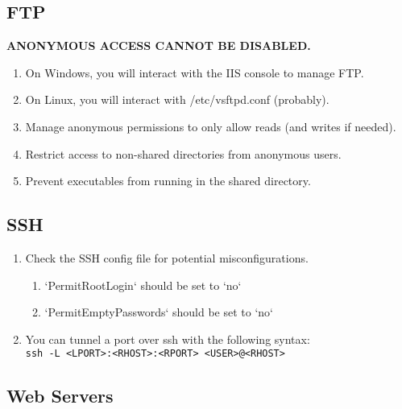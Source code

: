 \documentclass[12pt,letterpaper]{article}
\def\code#1{\textcolor{iris}{\texttt{#1}}}
\def\bf#1{\textbf{#1}}
\begin{document}
\subsection{FTP}

\bf{ANONYMOUS ACCESS CANNOT BE DISABLED.}

\begin{enumerate}
	\item On Windows, you will interact with the IIS console to manage FTP.
	\item On Linux, you will interact with /etc/vsftpd.conf (probably).
	\item Manage anonymous permissions to only allow reads (and writes if needed).
	\item Restrict access to non-shared directories from anonymous users.
	\item Prevent executables from running in the shared directory.
\end{enumerate}

\subsection{SSH}

\begin{enumerate}
	\item Check the SSH config file for potential misconfigurations.
	\begin{enumerate}
		\item `PermitRootLogin` should be set to `no`
		\item `PermitEmptyPasswords` should be set to `no`
	\end{enumerate}
	\item You can tunnel a port over ssh with the following syntax: \\
		\code{ssh -L <LPORT>:<RHOST>:<RPORT> <USER>@<RHOST>}
\end{enumerate}

\subsection{Web Servers}
\end{document}
